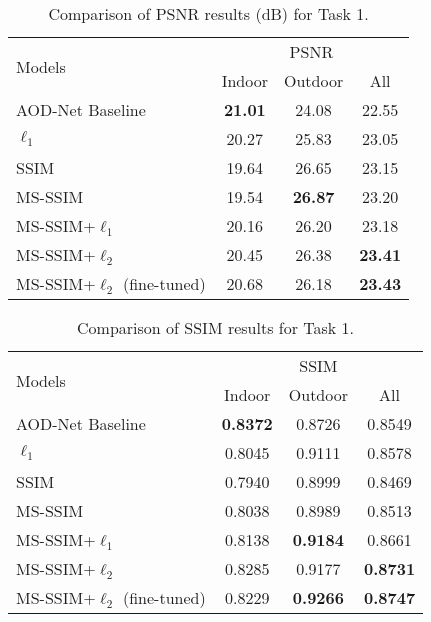\documentclass[10pt,twocolumn,letterpaper]{article}
\begin{document}
\begin{table}[t]
\begin{center}
\begin{tabular}{|l|c|c||c|}
\hline
\multirow{2}{*}{Models}&\multicolumn{3}{c|}{PSNR}\\ \cline{2-4} 
&Indoor&Outdoor&All\\ \hline
AOD-Net Baseline&\textbf{21.01}&24.08&22.55\\ \hline
$\ell_1$&20.27&25.83&23.05\\ \hline
SSIM&19.64&26.65&23.15\\ \hline
MS-SSIM&19.54&\textbf{26.87}&23.20\\ \hline
MS-SSIM+$\ell_1$&20.16&26.20&23.18\\ \hline
MS-SSIM+$\ell_2$&20.45&26.38&\textbf{23.41}\\ \hline
\hline
MS-SSIM+$\ell_2$ (fine-tuned)&20.68&26.18&\textbf{23.43}\\ \hline
\end{tabular}
\end{center}
\caption{Comparison of PSNR results (dB) for Task 1.}
\label{psnr-res-overall}
\end{table}

\begin{table}[t]
\begin{center}
\begin{tabular}{|l|c|c||c|}
\hline
\multirow{2}{*}{Models}&\multicolumn{3}{c|}{SSIM}\\ \cline{2-4} 
&Indoor&Outdoor&All\\ \hline
AOD-Net Baseline &\textbf{0.8372}&0.8726&0.8549\\ \hline
$\ell_1$&0.8045&0.9111&0.8578\\ \hline
SSIM&0.7940&0.8999&0.8469\\ \hline
MS-SSIM&0.8038&0.8989&0.8513\\ \hline
MS-SSIM+$\ell_1$&0.8138&\textbf{0.9184}&0.8661\\ \hline
MS-SSIM+$\ell_2$&0.8285&0.9177&\textbf{0.8731}\\ \hline
\hline
MS-SSIM+$\ell_2$ (fine-tuned)&0.8229 & \textbf{0.9266} &\textbf{0.8747}\\ \hline
\end{tabular}
\end{center}
\caption{Comparison of SSIM results for Task 1.}
\label{ssim-res-overall}
\end{table}

\end{document}

